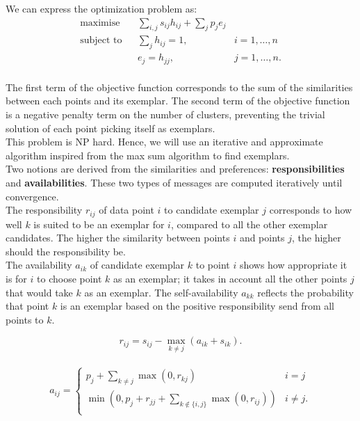 \documentclass{ipol}
\begin{document}
We can express the optimization problem as:
\begin{equation*}
\renewcommand{\arraystretch}{2}
\begin{array}{ccll}
\text{maximise} & & \sum_{i, j} s_{ij} h_{ij} + \sum_{j} p_j e_j & \\
\text{subject to} &  & \sum_{j} h_{ij} = 1, & i = 1, \dots, n \\
		  &  & e_{j} = h_{jj}, & j = 1, \dots, n.\\
\end{array}
\end{equation*}

The first term of the objective function corresponds to the sum of the
similarities between each points and its exemplar. The second term of the
objective function is a negative penalty term on the number of clusters,
preventing the trivial solution of each point picking itself as exemplars. \\

This problem is NP hard. Hence, we will use an iterative and
approximate algorithm inspired from the max sum algorithm to find exemplars.
\\

Two notions are derived from the similarities and preferences:
\textbf{responsibilities} and \textbf{availabilities}. These two types of
messages are computed iteratively until convergence.\\

The responsibility $r_{ij}$ of data point $i$ to
candidate exemplar $j$ corresponds to how well $k$ is suited to be an exemplar
for $i$, compared to all the other exemplar candidates. The higher the
similarity between points $i$ and points $j$, the higher should the
responsibility be. \\

The availability $a_{ik}$ of candidate exemplar $k$ to point $i$ shows how
appropriate it is for $i$ to choose point $k$ as an exemplar; it takes in account
all the other points $j$ that would take $k$ as an exemplar. The
self-availability $a_{kk}$ reflects the probability that point $k$ is an
exemplar based on the positive responsibility send from all points to $k$.


\begin{equation*}
r_{ij} = s_{ij} - \max_{k \neq j} (a_{ik} + s_{ik}).
\end{equation*}
\\


\begin{equation*}
a_{ij} = \begin{cases}
	    p_j + \sum_{k \neq j} \max(0, r_{kj}) &  i = j \\
	    \min ( 0, p_j + r_{jj} + \sum_{k \notin \{i, j\} } \max (0, r_{ij}))
	    & i \neq j.\\
	 \end{cases}
\end{equation*}
\end{document}
